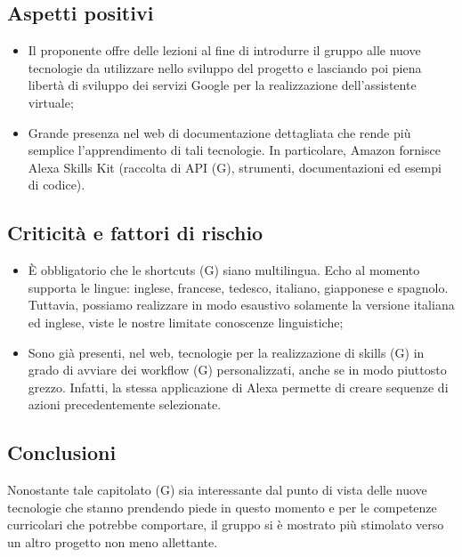 \documentclass[a4paper, 11pt]{article}
\begin{document}
	\subsection{Aspetti positivi}
	\begin{itemize}
		\item Il proponente offre delle lezioni al fine di introdurre il gruppo alle nuove tecnologie da utilizzare nello sviluppo del 				progetto e lasciando poi piena libertà di sviluppo dei servizi Google per la realizzazione dell’assistente virtuale;
		\item Grande presenza nel web di documentazione dettagliata che rende più semplice l’apprendimento di tali tecnologie. In 			particolare, Amazon fornisce Alexa Skills Kit (raccolta di API (G), strumenti, documentazioni ed esempi di codice).
	\end{itemize}
	\subsection{Criticità e fattori di rischio}
	\begin{itemize}
		\item È obbligatorio che le shortcuts (G) siano multilingua. Echo al momento supporta le lingue: inglese, francese, tedesco, 			italiano, giapponese e spagnolo. Tuttavia, possiamo realizzare in modo esaustivo solamente la versione italiana ed inglese, 			viste le nostre limitate conoscenze linguistiche;
		\item Sono già presenti, nel web, tecnologie per la realizzazione di skills (G) in grado di avviare dei workflow (G) 					personalizzati, anche se in modo piuttosto grezzo. Infatti, la stessa applicazione di Alexa permette di creare sequenze di 			azioni precedentemente selezionate.
	\end{itemize}
	\subsection{Conclusioni}
		Nonostante tale capitolato (G) sia interessante dal punto di vista delle nuove tecnologie che stanno prendendo piede in 				questo momento e per le competenze curricolari che potrebbe comportare, il gruppo si è mostrato più stimolato verso un 			altro progetto non meno allettante.
	
\end{document}
